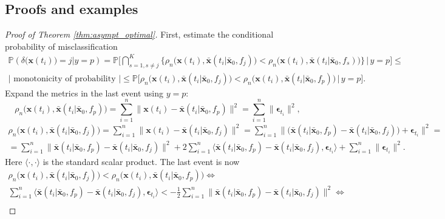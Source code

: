 \documentclass[referee, pdflatex, sn-mathphys-num]{sn-jnl}
\theoremstyle{definition}
\theoremstyle{plain}
\newcommand{\bx}{\ensuremath{\mathbf{x}}}
\newcommand{\bbx}{\ensuremath{\bar{\mathbf{x}}}}
\newcommand{\beps}{\ensuremath{\boldsymbol{\epsilon}}}
\begin{document}
	
	
	\begin{appendices}
		\section{Proofs and examples}\label{app:proofs}
		
		\begin{proof}[Proof of Theorem \ref{thm:asympt_optimal}]
			First, estimate the conditional probability of misclassification
			\begin{multline*}
				\mathbb{P}(\delta \big( \bx(t_i) \big) = j | y = p) = \mathbb{P}\big[ \bigcap_{s = 1, s \not=j}^{K} \{ \rho_n\big( \bx(t_i), \bbx(t_i | \bbx_0, f_j) \big) < \rho_n\big( \bx(t_i), \bbx(t_i | \bbx_0, f_s) \big) \} \,\big|\, y = p \big] \le \\ |\text{ monotonicity of probability }| \le \mathbb{P}\big[ \rho_n\big( \bx(t_i), \bbx(t_i | \bbx_0, f_j) \big) < \rho_n\big( \bx(t_i), \bbx(t_i | \bbx_0, f_p) \big) \,\big|\, y = p \big].
			\end{multline*}
			Expand the metrics in the last event using $y = p$:
			\begin{equation*}
				\rho_n\big( \bx(t_i), \bbx(t_i | \bbx_0, f_p) \big) = \sum\limits_{i=1}^n \lVert  \bx(t_i) - \bbx(t_i | \bbx_0, f_p)  \rVert^2 = \sum\limits_{i=1}^n \lVert \beps_{t_i} \rVert^2,
			\end{equation*}
			\begin{multline*}
				\rho_n\big( \bx(t_i), \bbx(t_i | \bbx_0, f_j) \big) = \sum\limits_{i=1}^n \lVert  \bx(t_i) - \bbx(t_i | \bbx_0, f_j)  \rVert^2 = \sum\limits_{i=1}^n \lVert \big( \bbx(t_i | \bbx_0, f_p) - \bbx(t_i | \bbx_0, f_j) \big) + \beps_{t_i} \rVert^2 = \\ = \sum\limits_{i=1}^n \lVert \bbx(t_i | \bbx_0, f_p) - \bbx(t_i | \bbx_0, f_j) \rVert^2 + 2 \sum\limits_{i=1}^n \langle \bbx(t_i | \bbx_0, f_p) - \bbx(t_i | \bbx_0, f_j) , \beps_{t_i} \rangle + \sum\limits_{i=1}^n \lVert \beps_{t_i} \rVert^2.
			\end{multline*}
			Here $\langle \cdot, \cdot \rangle$ is the standard scalar product. The last event is now
			\begin{gather*}
				\rho_n\big( \bx(t_i), \bbx(t_i | \bbx_0, f_j) \big) < \rho_n\big( \bx(t_i), \bbx(t_i | \bbx_0, f_p) \big) \Leftrightarrow \\
				\sum\limits_{i=1}^n \langle \bbx(t_i | \bbx_0, f_p) - \bbx(t_i | \bbx_0, f_j) , \beps_{t_i} \rangle < - \frac{1}{2} \sum\limits_{i=1}^n \lVert \bbx(t_i | \bbx_0, f_p) - \bbx(t_i | \bbx_0, f_j) \rVert^2 \Leftrightarrow \\

\end{gather*}
\end{proof}
\end{appendices}
\end{document}
